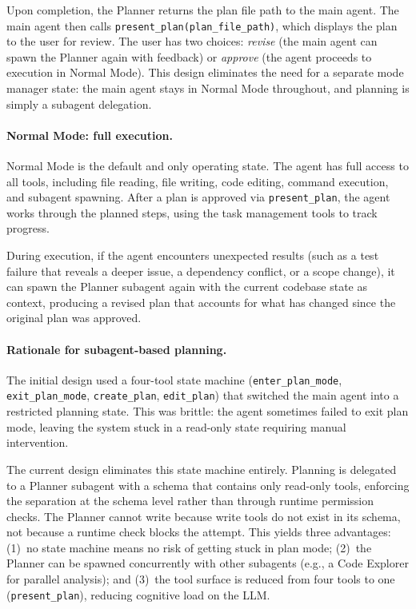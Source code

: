 Upon completion, the Planner returns the plan file path to the main agent. The main agent then calls \texttt{present\_plan(plan\_file\_path)}, which displays the plan to the user for review. The user has two choices: \emph{revise} (the main agent can spawn the Planner again with feedback) or \emph{approve} (the agent proceeds to execution in Normal Mode). This design eliminates the need for a separate mode manager state: the main agent stays in Normal Mode throughout, and planning is simply a subagent delegation.

\paragraph{Normal Mode: full execution.} Normal Mode is the default and only operating state. The agent has full access to all tools, including file reading, file writing, code editing, command execution, and subagent spawning. After a plan is approved via \texttt{present\_plan}, the agent works through the planned steps, using the task management tools to track progress.

During execution, if the agent encounters unexpected results (such as a test failure that reveals a deeper issue, a dependency conflict, or a scope change), it can spawn the Planner subagent again with the current codebase state as context, producing a revised plan that accounts for what has changed since the original plan was approved.

\paragraph{Rationale for subagent-based planning.} The initial design used a four-tool state machine (\texttt{enter\_plan\_mode}, \texttt{exit\_plan\_mode}, \texttt{create\_plan}, \texttt{edit\_plan}) that switched the main agent into a restricted planning state. This was brittle: the agent sometimes failed to exit plan mode, leaving the system stuck in a read-only state requiring manual intervention.

The current design eliminates this state machine entirely. Planning is delegated to a Planner subagent with a schema that contains only read-only tools, enforcing the separation at the schema level rather than through runtime permission checks. The Planner cannot write because write tools do not exist in its schema, not because a runtime check blocks the attempt. This yields three advantages: (1)~no state machine means no risk of getting stuck in plan mode; (2)~the Planner can be spawned concurrently with other subagents (e.g., a Code Explorer for parallel analysis); and (3)~the tool surface is reduced from four tools to one (\texttt{present\_plan}), reducing cognitive load on the LLM.

